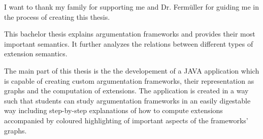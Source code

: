\documentclass[draft,final]{vutinfth} %
\newcommand{\hl}{\par\vspace{6pt}} %
\begin{document}
\frontmatter %

\addstatementpage

\begin{acknowledgements*}
I want to thank my family for supporting me and Dr. Ferm{\"u}ller for guiding me in the process of creating this thesis.
\end{acknowledgements*}

\begin{abstract*}
This bachelor thesis explains argumentation frameworks and provides their most important semantics. It further analyzes the relations between different types of extension semantics.\hl %
The main part of this thesis is the the developement of a JAVA application which is capable of creating custom argumentation frameworks, their representation as graphs and the computation of extensions. The application is created in a way such that students can study argumentation frameworks in an easily digestable way including step-by-step explanations of how to compute extensions accompanied by coloured highlighting of important aspects of the frameworks' graphs.
\end{abstract*}


\tableofcontents* %

\mainmatter
\end{document}
